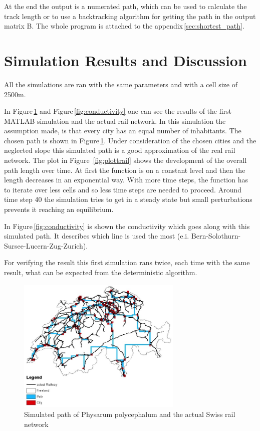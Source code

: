 \documentclass[11pt]{scrartcl}
\begin{document}
\null

At the end the output is a numerated path, which can be used to calculate the track length or to use a backtracking algorithm for getting the path in the output matrix B. The whole program is attached to the appendix\,\ref{sec:shortest_path}.



\section{Simulation Results and Discussion}
\label{sec:results}
All the simulations are ran with the same parameters and with a cell size of 2500m.

In Figure\,\ref{fig:path} and Figure\,\ref{fig:conductivity} one can see the results of the first MATLAB simulation and the actual rail network. In this simulation the assumption made, is that every city has an equal number of inhabitants. The chosen path is shown in Figure\,\ref{fig:path}. Under consideration of the chosen cities and the neglected slope this simulated path is a good approximation of the real rail network. The plot in Figure \,\ref{fig:plottrail} shows the development of the overall path length over time. At first the function is on a constant level and then the length decreases in an exponential way. With more time steps,  the function has to iterate over less cells and so less time steps are needed to proceed. Around time step 40 the simulation tries to get in a steady state but small perturbations prevents it reaching an equilibrium.

In Figure\,\ref{fig:conductivity} is shown the conductivity which goes along with this simulated path. It describes which line is used the most (e.i. Bern-Solothurn-Sursee-Lucern-Zug-Zurich).

For verifying the result this first simulation rans twice, each time with the same result, what can be expected from the deterministic algorithm.



\begin{figure}[H]
	\centering
	\includegraphics[width=0.7\textwidth]{figures/path_railway}
	\caption{Simulated path of Physarum polycephalum and the actual Swiss rail network}
	\label{fig:path}
\end{figure}
\end{document}
